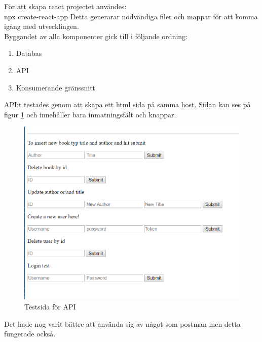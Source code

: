 \documentclass{article}
\begin{document}
\noindent
För att skapa react projectet användes:\\
npx create-react-app\newline
Detta generarar nödvändiga filer och mappar för att komma igång med utvecklingen.\\
\noindent
Byggandet av alla komponenter gick till i följande ordning:
\begin{enumerate}
	\item Databas
	\item API
	\item Konsumerande gränssnitt
\end{enumerate}
API:t testades genom att skapa ett html sida på samma host. 
Sidan kan ses på figur \ref{fig:testsida} och innehåller bara inmatningsfält och knappar.
\begin{figure}[H]
	\centering
	\includegraphics[width=0.8\linewidth]{Images/form.PNG}
	\caption{Testsida för API}
	\label{fig:testsida}
\end{figure}
\noindent
Det hade nog varit bättre att använda sig av något som postman men detta fungerade också.
\end{document}
